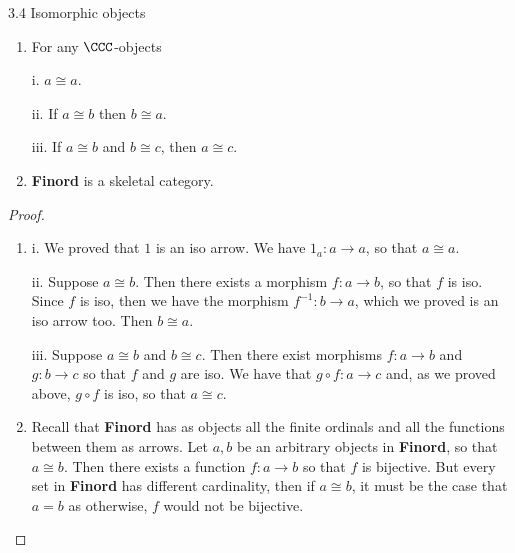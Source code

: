 \begin{exercise}{3.4 Isomorphic objects}
\begin{enumerate}
    \item For any $\CCC$-objects

    i. $a\cong a$.
    
    ii. If $a\cong b$ then $b\cong a$.

    iii. If $a\cong b$ and $b\cong c$, then $a\cong c$. 
    \item \textbf{Finord} is a skeletal category.
\end{enumerate}
\end{exercise}
\begin{proof}
 \begin{enumerate}
     \item i. We proved that $1$ is an iso arrow. We have $1_a:a\rightarrow a$, so that $a\cong a$.

     ii. Suppose $a\cong b$. Then there exists a morphism $f:a\rightarrow b$, so that $f$ is iso. Since $f$ is iso, then we have the morphism $f^{-1}:b\rightarrow a$, which we proved is an iso arrow too. Then $b\cong a$. 

     iii. Suppose $a\cong b$ and $b\cong c$. Then there exist morphisms $f:a\rightarrow b$ and $g:b\rightarrow c$ so that $f$ and $g$ are iso. We have that $g\circ f:a\rightarrow c$ and, as we proved above, $g\circ f$ is iso, so that $a\cong c$.
     \item Recall that \textbf{Finord} has as objects all the finite ordinals and all the functions between them as arrows. Let $a, b$ be an arbitrary objects in \textbf{Finord}, so that $a\cong b$. Then there exists a function $f:a\rightarrow b$ so that $f$ is bijective. But every set in \textbf{Finord} has different cardinality, then if $a\cong b$, it must be the case that $a=b$ as otherwise, $f$ would not be bijective.
 \end{enumerate}
\end{proof}

